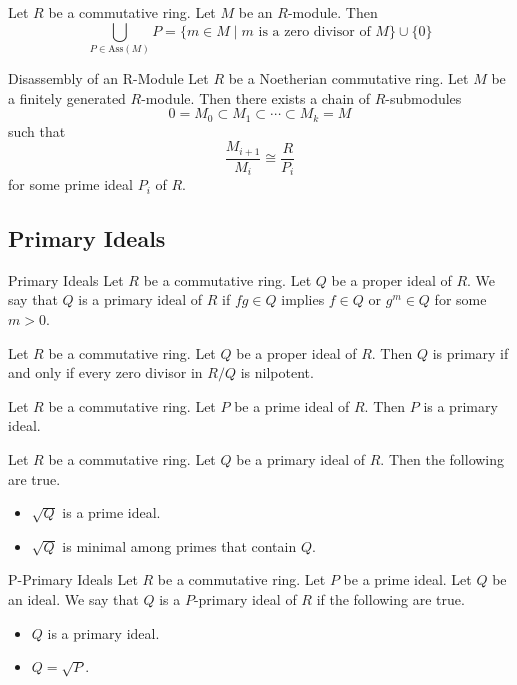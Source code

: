 \documentclass[a4paper]{article}
\begin{document}
\begin{prp}{}{} Let $R$ be a commutative ring. Let $M$ be an $R$-module. Then $$\bigcup_{P\in\text{Ass}(M)}P=\{m\in M\;|\;m\text{ is a zero divisor of }M\}\cup\{0\}$$
\end{prp}

\begin{thm}{Disassembly of an R-Module}{} Let $R$ be a Noetherian commutative ring. Let $M$ be a finitely generated $R$-module. Then there exists a chain of $R$-submodules $$0=M_0\subset M_1\subset\cdots\subset M_k=M$$ such that $$\frac{M_{i+1}}{M_i}\cong\frac{R}{P_i}$$ for some prime ideal $P_i$ of $R$. 
\end{thm}

\subsection{Primary Ideals}
\begin{defn}{Primary Ideals}{} Let $R$ be a commutative ring. Let $Q$ be a proper ideal of $R$. We say that $Q$ is a primary ideal of $R$ if $fg\in Q$ implies $f\in Q$ or $g^m\in Q$ for some $m>0$. 
\end{defn}

\begin{prp}{}{} Let $R$ be a commutative ring. Let $Q$ be a proper ideal of $R$. Then $Q$ is primary if and only if every zero divisor in $R/Q$ is nilpotent. 
\end{prp}

\begin{lmm}{}{} Let $R$ be a commutative ring. Let $P$ be a prime ideal of $R$. Then $P$ is a primary ideal. 
\end{lmm}

\begin{lmm}{}{} Let $R$ be a commutative ring. Let $Q$ be a primary ideal of $R$. Then the following are true. 
\begin{itemize}
\item $\sqrt{Q}$ is a prime ideal. 
\item $\sqrt{Q}$ is minimal among primes that contain $Q$. 
\end{itemize}
\end{lmm}

\begin{defn}{P-Primary Ideals}{} Let $R$ be a commutative ring. Let $P$ be a prime ideal. Let $Q$ be an ideal. We say that $Q$ is a $P$-primary ideal of $R$ if the following are true. 
\begin{itemize}
\item $Q$ is a primary ideal. 
\item $Q=\sqrt{P}$. 
\end{itemize}
\end{defn}
\end{document}
